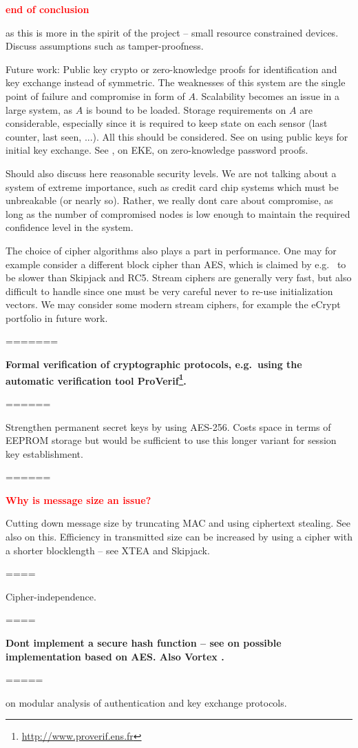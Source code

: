 \textcolor{red}{\bf end of conclusion}
\vspace{30mm}



as this is more in the spirit of the project -- small resource constrained devices. Discuss assumptions such as tamper-proofness.

Future work: Public key crypto or zero-knowledge proofs for identification and key exchange instead of symmetric. The weaknesses of this system are the single point of failure and compromise in form of $A$. Scalability becomes an issue in a large system, as $A$ is bound to be loaded. Storage requirements on $A$ are considerable, especially since it is required to keep state on each sensor (last counter, last seen, ...). All this should be considered. See \cite{rfc-4556-2006} on using public keys for initial key exchange.
See \cite{bellovin1992}, \cite{bellovin1993} on EKE, \cite{wu1997} on zero-knowledge password proofs. 

Should also discuss here reasonable security levels. We are not talking about a system of extreme importance, such as credit card chip systems which must be unbreakable (or nearly so). Rather, we really dont care about compromise, as long as the number of compromised nodes is low enough to maintain the required confidence level in the system.

The choice of cipher algorithms also plays a part in performance. One may for example consider a different block cipher than AES, which is claimed by e.g.\  to be slower than Skipjack and RC5. Stream ciphers are generally very fast, but also difficult to handle since one must be very careful never to re-use initialization vectors. We may consider some modern stream ciphers, for example the eCrypt portfolio in future work.


=======

\textbf{Formal verification of cryptographic protocols, e.g.\ using the automatic verification tool ProVerif\footnote{\url{http://www.proverif.ens.fr}}.}


======

Strengthen permanent secret keys by using AES-256. Costs space in terms of EEPROM storage but would be sufficient to use this longer variant for session key establishment.

======

\textcolor{red}{\bf Why is message size an issue?}

Cutting down message size by truncating MAC and using ciphertext stealing. See also \cite{karlof2004} on this.
Efficiency in transmitted size can be increased by using a cipher with a shorter blocklength -- see XTEA and Skipjack.

====

Cipher-independence.

====

\textbf{Dont implement a secure hash function -- see \cite{cohen2001} on possible implementation based on AES. Also Vortex \cite{gueron2008}.}


=====

\cite{bellare1998a} on modular analysis of authentication and key exchange protocols.